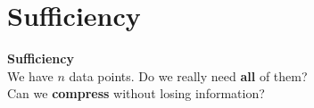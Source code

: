 \documentclass[aspectratio=169]{beamer}
\begin{document}



\section{Sufficiency}

\begin{frame}
\begin{center}
\vspace{1cm}
{\LARGE\bfseries\textcolor{popblue}{Sufficiency}}\\[15pt]
{\large We have $n$ data points. Do we really need \textbf{all} of them?}\\[4pt]
{\large Can we \textbf{compress} without losing information?}
\end{center}
\end{frame}
\end{document}

